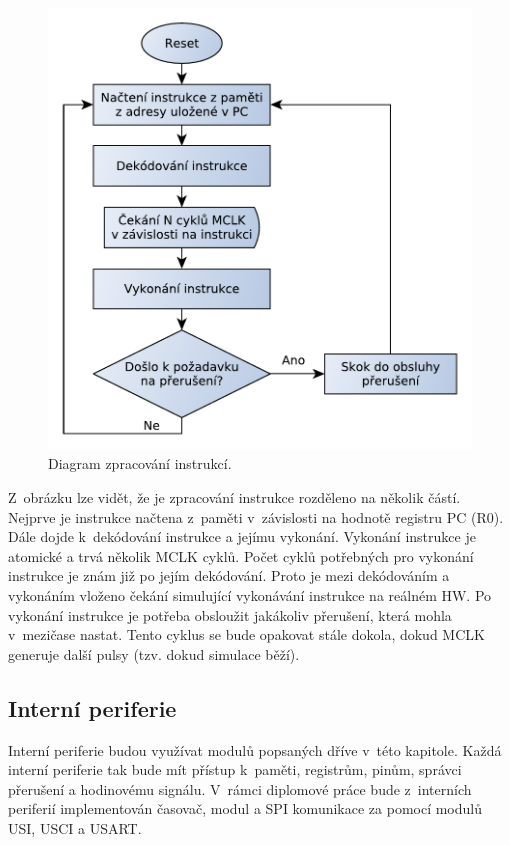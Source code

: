 \begin{figure}[h]
\centering
\includegraphics[trim=0cm 0cm 0cm 0cm, scale=0.7]{fig/msp430_inst}
\caption{Diagram zpracování instrukcí.}
\label{fig:msp430_inst}
\end{figure}

Z~obrázku lze vidět, že je zpracování instrukce rozděleno na několik částí. Nejprve je instrukce načtena z~paměti v~závislosti na hodnotě registru PC (R0).
Dále dojde k~dekódování instrukce a jejímu vykonání. Vykonání instrukce je atomické a trvá několik MCLK cyklů. Počet cyklů potřebných pro vykonání
instrukce je znám již po jejím dekódování. Proto je mezi dekódováním a vykonáním vloženo čekání simulující vykonávání instrukce na reálném HW.
Po vykonání instrukce je potřeba obsloužit jakákoliv přerušení, která mohla v~mezičase nastat. Tento cyklus se bude opakovat stále dokola, dokud MCLK generuje další pulsy (tzv. dokud simulace běží).

\subsection{Interní periferie}

Interní periferie budou využívat modulů popsaných dříve v~této kapitole. Každá interní periferie tak bude mít přístup k~paměti, registrům, pinům, správci
přerušení a hodinovému signálu. V~rámci diplomové práce bude z~interních periferií implementován časovač, modul a SPI komunikace za pomocí modulů USI, USCI a USART.

